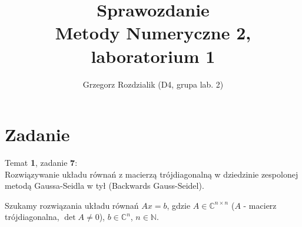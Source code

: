 \documentclass[12pt]{article}
\begin{document}
	\title{Sprawozdanie\\Metody Numeryczne 2, laboratorium 1}
	\author{Grzegorz Rozdzialik (D4, grupa lab. 2)}
	\maketitle	

	\section{Zadanie}
	{\Large Temat \textbf{1}, zadanie \textbf{7}:}\\
	Rozwiązywanie układu równań z macierzą trójdiagonalną w dziedzinie zespolonej metodą Gaussa-Seidla w tył (Backwards Gauss-Seidel).
	
	Szukamy rozwiązania układu równań $Ax = b$, gdzie
	$A \in \mathbb{C}^{n \times n}$ ($A$ - macierz trójdiagonalna, $\det{A} \neq 0$),
	$b \in \mathbb{C}^{n}$,
	$n \in \mathbb{N}$.
	
\end{document}
